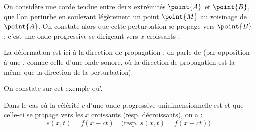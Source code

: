 \begin{exemple}
On considère une corde tendue entre deux extrémités $\point{A}$ et $\point{B}$, que l'on perturbe en soulevant légèrement un point $\point{M}$ au voisinage de $\point{A}$. On constate alors que cette perturbation se propage vers $\point{B}$ : c'est une onde progressive se dirigeant vers $x$ croissants :

\begin{figure}[H]
\begin{center}
\end{center}
\end{figure}

\noindent La déformation est ici  à la direction de propagation : on parle de  (par opposition à une , comme celle d'une onde sonore, où la direction de propagation est la même que la direction de la perturbation).
\end{exemple}

\begin{attention}
On constate sur cet exemple qu'.
\end{attention}

\begin{propriete}
Dans le cas où la célérité $c$ d'une onde progressive unidimensionnelle est  et que celle-ci se propage  vers les $x$ croissants (resp. décroissants), on a :
\[s(x, t) = f(x - ct) \quad \text{(resp. } s(x, t) = f(x + ct) \text{)}\]
\end{propriete}



